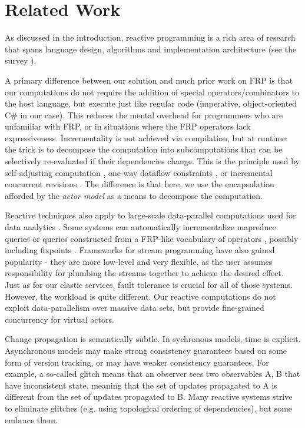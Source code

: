 \section{Related Work}

As discussed in the introduction, reactive programming is a rich area of research that spans language design, algorithms and implementation architecture (see the survey \cite{reactivesurvey}).

A primary difference between our solution and much prior work on FRP \cite{frp-firstprinciples,frp-animation,frp-frtime,frp-arrows,elm,afp,flapjax,frappe} is that our computations do not require the addition of special operators/combinators to the host language, but execute just like regular code (imperative, object-oriented C\# in our case). This reduces the mental overhead for programmers who are unfamiliar with FRP, or in situations where the FRP operators lack expressiveness. Incrementality is not achieved via compilation, but at runtime: the trick is to decompose the computation into subcomputations that can be selectively re-evaluated if their dependencies change. This is the principle used by self-adjusting computation \cite{acar-ahmed-blume-POPL08,Acar:SelfAdjustingExperiments,Acar:SelfAdjustingOverview,Hammer:Ceal09,Acar:SelfAdjustingTypes10}, one-way dataflow constraints \cite{camil}, or incremental concurrent revisions \cite{burckhardt-leijen-yi-sadowski-ball-OOPSLA11}. The difference is that here, we use the encapsulation afforded by the \emph{actor model} as a means to decompose the computation.

Reactive techniques also apply to large-scale data-parallel computations used for data analytics \cite{mapreduce,spark}. Some systems can automatically incrementalize mapreduce queries\cite{mronline,incoop} or queries constructed from a FRP-like vocabulary of operators \cite{nectar}, possibly including fixpoints \cite{frank}. Frameworks for stream programming \cite{flink} have also gained popularity - they are more low-level and very flexible, as the user assumes responsibility for plumbing the streams together to achieve the desired effect. Just as for our elastic services, fault tolerance is crucial for all of those systems. However, the workload is quite different. Our reactive computations do not exploit data-parallelism over massive data sets, but provide fine-grained concurrency for virtual actors.


\hidden
{
Change propagation is semantically subtle. In sychronous models, time is explicit. Asynchronous models may make strong consistency guarantees based on some form of version tracking, or may have weaker consistency guarantees. For example, a so-called glitch means that an observer sees two observables A, B that have inconsistent state, meaning that the set of updates propagated to A is different from the set of updates propagated to B. Many reactive systems strive to eliminate glitches (e.g. using topological ordering of dependencies), but some embrace them.
}

